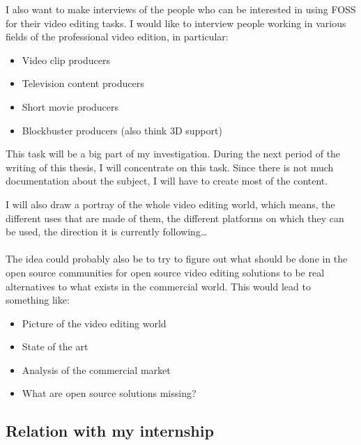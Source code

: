       I also want to make interviews of the people who can be interested in
      using FOSS for their video editing tasks. I would like to interview
      people working in various fields of the professional video edition,
      in particular:
      \begin{itemize}
        \item {Video clip producers}
        \item {Television content producers}
        \item {Short movie producers}
        \item {Blockbuster producers (also think 3D support)}
      \end{itemize}
      This task will be a big part of my investigation. During the next period
      of the writing of this thesis, I will concentrate on this task. Since
      there is not much documentation about the subject, I will have to create
      most of the content.

      I will also draw a portray of the whole video editing world, which
      means, the different uses that are made of them, the different platforms on which
      they can be used, the  direction it is currently following\ldots

  \paragraph{}
    The idea could probably also be to try to figure out what should be done
    in the open source communities for open source video editing solutions
    to be real alternatives to what exists in the commercial world. This
    would lead to something like:
    \begin {itemize}
      \item{Picture of the video editing world}
      \item{State of the art}
      \item{Analysis of the commercial market}
      \item{What are open source solutions missing?}
    \end{itemize}

\subsection{Relation with my internship}
